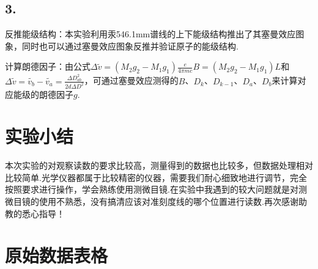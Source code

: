 \documentclass{thureport}
\begin{document}
\subsection*{3.}
\begin{clause}
	\item 反推能级结构：本实验利用汞546.1mm谱线的上下能级结构推出了其塞曼效应图象，同时也可以通过塞曼效应图象反推并验证原子的能级结构.
	\item 计算朗德因子：由公式$\Delta \tilde{v}=(M_2g_2-M_1g_1)\frac{e}{4\pi mc}B=(M_2g_2-M_1g_1)L$和$\Delta \tilde{v}=\tilde{v_b}-\tilde{v_a}=\frac{\Delta D_{ab}^2}{2d\Delta D^2}$，可通过塞曼效应测得的$B$、$D_k$、$D_{k-1}$、$D_a$、$D_b$来计算对应能级的朗德因子$g$.
\end{clause}

\section{实验小结}
本次实验的对观察读数的要求比较高，测量得到的数据也比较多，但数据处理相对比较简单.光学仪器都属于比较精密的仪器，需要我们耐心细致地进行调节，完全按照要求进行操作，学会熟练使用测微目镜.在实验中我遇到的较大问题就是对测微目镜的使用不熟悉，没有搞清应该对准刻度线的哪个位置进行读数.再次感谢助教的悉心指导！

\newpage
\section{原始数据表格}
\end{document}
